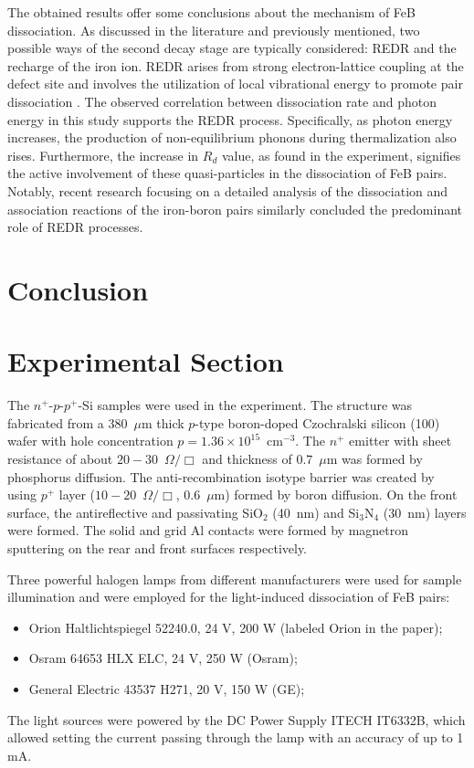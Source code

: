 \documentclass{WileyMSP-template}
\begin{document}
The obtained results offer some conclusions about the mechanism of FeB dissociation.
As discussed in the literature and previously mentioned, two possible ways of the second decay stage
are typically considered: REDR and the recharge of the iron ion.
REDR arises from strong electron-lattice coupling at the defect site
and involves the utilization of local vibrational energy to promote pair dissociation \cite{FeBAssJAP2014,Sun2021,Macdonald2004}.
The observed correlation between dissociation rate and photon energy in this study supports the REDR process.
Specifically, as photon energy increases, the production of non-equilibrium phonons during thermalization also rises.
Furthermore, the increase in $R_d$ value, as found in the experiment, signifies the active involvement of these quasi-particles in the dissociation of FeB pairs.
Notably, recent research \cite{Sun2021} focusing on a detailed analysis of the dissociation and association reactions of the iron-boron pairs similarly concluded the predominant role of REDR processes.



\section{Conclusion}\label{SecConsl}





\section{Experimental Section}
\label{SecExp}

The $n^+$-$p$-$p^+$-Si samples were used in the experiment.
The structure was fabricated from a 380~$\mu$m thick $p$-type boron-doped
Czochralski silicon (100) wafer with hole concentration $p=1.36\times10^{15}$~cm$^{-3}$.
The $n^+$ emitter with sheet resistance of about $20-30$~$\Omega/\Box$
and  thickness of $0.7$~$\mu$m was formed by phosphorus diffusion.
The anti-recombination isotype barrier was created by using $p^+$
layer ($10-20$~$\Omega/\Box$, $0.6$~$\mu$m) formed by boron diffusion.
On the front surface, the antireflective and passivating SiO$_2$ (40~nm) and Si$_3$N$_4$ (30~nm) layers
were formed.
The solid and grid Al contacts were formed by magnetron sputtering on the rear and front surfaces respectively.

Three powerful halogen lamps from different manufacturers were used for sample illumination and were employed for the light-induced dissociation of FeB pairs:
\begin{itemize}
  \item Orion Haltlichtspiegel 52240.0, 24 V, 200 W (labeled Orion in the paper);
  \item Osram 64653 HLX ELC, 24 V, 250 W (Osram);
  \item General Electric 43537 H271, 20 V, 150 W (GE);
\end{itemize}
The light sources were powered by the DC Power Supply ITECH IT6332B, which allowed setting the current passing through the lamp with an accuracy of up to 1 mA.
\end{document}
